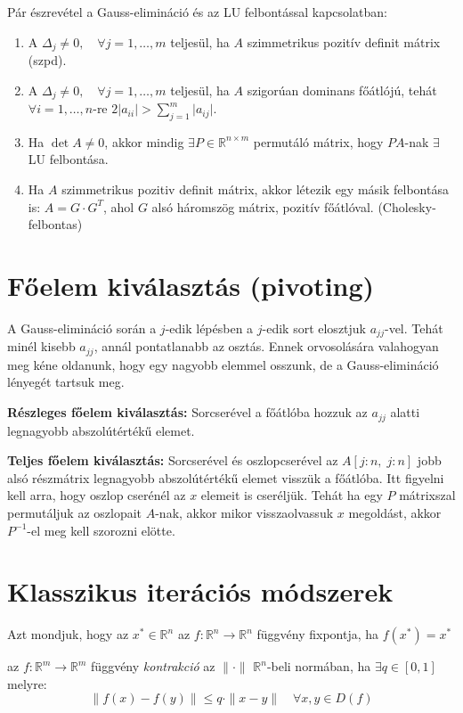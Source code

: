 \begin{megj} Pár észrevétel a Gauss-elimináció és az LU felbontással kapcsolatban:
    \begin{enumerate}
        \item A $\Delta_{j} \neq 0, \quad \forall j = 1, \dots, m$ teljesül, ha $A$ szimmetrikus pozitív definit mátrix (szpd).
        \item A $\Delta_{j} \neq 0, \quad \forall j = 1, \dots, m$ teljesül, ha $A$ szigorúan dominans főátlójú, tehát $\forall i = 1, \dots, n$-re $2\lvert a_{ii} \rvert > \sum_{j = 1}^{m} \lvert a_{ij} \rvert$.
        \item Ha $\det A \neq 0$, akkor mindig $\exists P \in \mathbb{R}^{n\times m}$ permutáló mátrix, hogy $PA$-nak $\exists$ LU felbontása.
        \item Ha $A$ szimmetrikus pozitiv definit mátrix, akkor létezik egy másik felbontása is: $A = G \cdot G^{T}$, ahol $G$ alsó háromszög mátrix, pozitív főátlóval. (Cholesky-felbontas)
    \end{enumerate}
\end{megj}

\section{Főelem kiválasztás (pivoting)}
A Gauss-elimináció során a $j$-edik lépésben a $j$-edik sort elosztjuk $a_{jj}$-vel. Tehát minél kisebb $a_{jj}$, annál pontatlanabb az osztás. Ennek orvosolására valahogyan meg kéne oldanunk, hogy egy nagyobb elemmel osszunk, de a Gauss-elimináció lényegét tartsuk meg.

\textbf{Részleges főelem kiválasztás:} Sorcserével a főátlóba hozzuk az $a_{jj}$ alatti legnagyobb abszolútértékű elemet.

\textbf{Teljes főelem kiválasztás:} Sorcserével és oszlopcserével az $A[j:n, \; j:n]$ jobb alsó részmátrix legnagyobb abszolútértékű elemet visszük a főátlóba. Itt figyelni kell arra, hogy oszlop cserénél az $x$ elemeit is cseréljük. Tehát ha egy $P$ mátrixszal permutáljuk az oszlopait $A$-nak, akkor mikor visszaolvassuk $x$ megoldást, akkor $P^{-1}$-el meg kell szorozni elötte.

\section{Klasszikus iterációs módszerek}
\begin{definition}
    Azt mondjuk, hogy az $x^{*} \in \mathbb{R}^{n}$ az $f:\mathbb{R}^{n}\to \mathbb{R}^{n}$ függvény fixpontja, ha $f(x^{*}) = x^{*}$
\end{definition}
\begin{definition}
    az $f:\mathbb{R}^{m}\to \mathbb{R}^{m}$ függvény \textit{kontrakció} az $\| \cdot \|$ $\mathbb{R}^{n}$-beli normában, ha $\exists q \in [0,1]$ melyre:
    \begin{equation*}
        \| f(x)-f(y) \| \leq q\cdot \| x-y \| \quad \forall x,y \in D(f)
    \end{equation*}
\end{definition}

